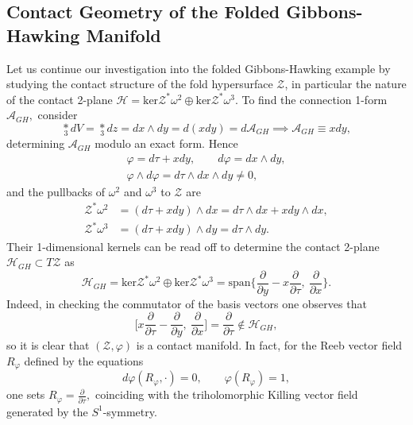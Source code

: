 \documentclass[a4paper,12pt, onecolumn, notitlepage]{article}
\theoremstyle{definition}
\theoremstyle{remark}
\newcommand{\w}{\omega}
\newcommand{\ddt}[1]{\frac{\partial #1}{\partial \tau}}
\newcommand{\dd}[2]{\frac{\partial #1}{\partial #2}}
\newcommand{\vp}{\varphi}
\begin{document}
\subsection{Contact Geometry of the Folded Gibbons-Hawking Manifold}	
Let us continue our investigation into the folded Gibbons-Hawking example by studying the contact structure of the fold hypersurface $\mathcal{Z}$, in particular the nature of the contact 2-plane $\mathcal{H}=\text{ker}\mathcal{Z}^{\ast}\w^{2}\oplus\text{ker}\mathcal{Z}^{\ast}\w^{3}.$ To find the connection 1-form $\mathcal{A}_{GH},$ consider
\begin{equation*}
	\underset{3}\ast dV=\underset{3}\ast dz = dx\wedge dy=d(xdy)=d\mathcal{A}_{GH} \implies \mathcal{A}_{GH} \equiv xdy,
\end{equation*}
determining $\mathcal{A}_{GH}$ modulo an exact form. Hence
\begin{gather*}
	\vp = d\tau + xdy,\qquad d\vp = dx\wedge dy,\\  \vp\wedge d\vp = d\tau\wedge dx\wedge dy \neq 0,
\end{gather*}
and the pullbacks of $\w^{2}$ and $\w^{3}$ to $\mathcal{Z}$ are
\begin{align*}
	\mathcal{Z}^{\ast}\w^{2} &= (d\tau + xdy)\wedge dx = d\tau\wedge dx + x dy\wedge dx,\\ \mathcal{Z}^{\ast}\w^{3} &= (d\tau + xdy)\wedge dy = d\tau\wedge dy.
\end{align*}
Their 1-dimensional kernels can be read off to determine the contact 2-plane $\mathcal{H}_{GH}\subset T\mathcal{Z}$ as
\begin{equation*}
	\mathcal{H}_{GH}=\text{ker}\mathcal{Z}^{\ast}\w^{2}\oplus\text{ker}\mathcal{Z}^{\ast}\w^{3}=\text{span}\bigg\{\dd{}{y}-x\dd{}{\tau},\ \dd{}{x} \bigg\}.
\end{equation*}
Indeed, in checking the commutator of the basis vectors one observes that
\begin{equation*}
	\bigg[ x\dd{}{\tau}-\dd{}{y},\ \dd{}{x}\bigg] = \dd{}{\tau}\not\in\mathcal{H}_{GH},
\end{equation*}
so it is clear that $(\mathcal{Z},\vp)$ is a contact manifold. In fact, for the Reeb vector field $R_{\vp}$ defined by the equations
\begin{equation*}
	d\vp(R_{\vp},\cdot) = 0,\qquad
	\vp(R_{\vp})  = 1,
\end{equation*}
one sets $R_{\vp}= \ddt{},$ coinciding with the triholomorphic Killing vector field generated by the $S^{1}$-symmetry.
\end{document}
